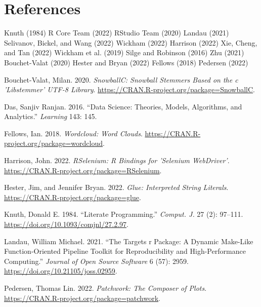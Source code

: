 \documentclass[
  letterpaper,
]{report}
\newlength{\cslhangindent}
\newlength{\cslentryspacingunit} %
\newenvironment{CSLReferences}[2] %
 {%
  \setlength{\parindent}{0pt}
  \ifodd #1
  \let\oldpar\par
  \def\par{\hangindent=\cslhangindent\oldpar}
  \fi
  \setlength{\parskip}{#2\cslentryspacingunit}
 }%
 {}
\begin{document}

\hypertarget{references}{%
\chapter*{References}\label{references}}

\leavevmode{}%
\begin{CSLReferences}{1}{0}
Knuth (1984) R Core Team (2022) RStudio Team (2020) Landau (2021)
Selivanov, Bickel, and Wang (2022) Wickham (2022) Harrison (2022) Xie,
Cheng, and Tan (2022) Wickham et al. (2019) Silge and Robinson (2016)
Zhu (2021) Bouchet-Valat (2020) Hester and Bryan (2022) Fellows (2018)
Pedersen (2022)

\leavevmode{}%
Bouchet-Valat, Milan. 2020. \emph{SnowballC: Snowball Stemmers Based on
the c 'Libstemmer' UTF-8 Library}.
\url{https://CRAN.R-project.org/package=SnowballC}.

\leavevmode{}%
Das, Sanjiv Ranjan. 2016. {``Data Science: Theories, Models, Algorithms,
and Analytics.''} \emph{Learning} 143: 145.

\leavevmode{}%
Fellows, Ian. 2018. \emph{Wordcloud: Word Clouds}.
\url{https://CRAN.R-project.org/package=wordcloud}.

\leavevmode{}%
Harrison, John. 2022. \emph{RSelenium: R Bindings for 'Selenium
WebDriver'}. \url{https://CRAN.R-project.org/package=RSelenium}.

\leavevmode{}%
Hester, Jim, and Jennifer Bryan. 2022. \emph{Glue: Interpreted String
Literals}. \url{https://CRAN.R-project.org/package=glue}.

\leavevmode{}%
Knuth, Donald E. 1984. {``Literate Programming.''} \emph{Comput. J.} 27
(2): 97--111. \url{https://doi.org/10.1093/comjnl/27.2.97}.

\leavevmode{}%
Landau, William Michael. 2021. {``The Targets r Package: A Dynamic
Make-Like Function-Oriented Pipeline Toolkit for Reproducibility and
High-Performance Computing.''} \emph{Journal of Open Source Software} 6
(57): 2959. \url{https://doi.org/10.21105/joss.02959}.

\leavevmode{}%
Pedersen, Thomas Lin. 2022. \emph{Patchwork: The Composer of Plots}.
\url{https://CRAN.R-project.org/package=patchwork}.


\end{CSLReferences}
\end{document}
